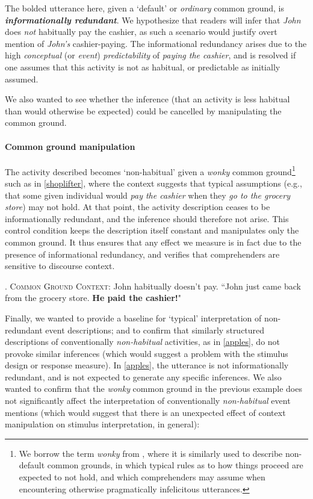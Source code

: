 \documentclass{sp}\usepackage[]{graphicx}\usepackage[]{color}
\begin{document}
The bolded utterance here, given a `default' or \textit{ordinary} common ground, is \textbf{\textit{informationally redundant}}.  We hypothesize that readers will infer that \textit{John} does \textit{not} habitually pay the cashier, as such a scenario would justify overt mention of \textit{John's} cashier-paying. The informational redundancy arises due to the high \textit{conceptual} (or \textit{event}) \textit{predictability} of \textit{paying the cashier}, and is resolved if one assumes that this activity is not as habitual, or predictable as initially assumed. 

We also wanted to see whether the inference (that an activity is less habitual than would otherwise be expected) could be cancelled by manipulating the common ground.

\paragraph{Common ground manipulation}

The activity described becomes `non-habitual' given a \textit{wonky} common ground\footnote{We borrow the term \textit{wonky} from \citet{Degen2015a}, where it is similarly used to describe non-default common grounds, in which typical rules as to how things proceed are expected to not hold, and which comprehenders may assume when encountering otherwise pragmatically infelicitous utterances.} such as in \ref{shoplifter}, where the context suggests that typical assumptions (e.g., that some given individual would \textit{pay the cashier} when they \textit{go to the grocery store}) may not hold.  At that point, the activity description ceases to be informationally redundant, and the inference should therefore not arise. This control condition keeps the description itself constant and manipulates only the common ground. It thus ensures that any effect we measure is in fact due to the presence of informational redundancy, and verifies that comprehenders are sensitive to discourse context.

\ex.\label{shoplifter} \textsc{Common Ground Context}: John habitually doesn't pay.  
``John just came back from the grocery store.  \textbf{He paid the cashier!}"

Finally, we wanted to provide a baseline for `typical' interpretation of non-redundant event descriptions; and to confirm that similarly structured descriptions of conventionally \textit{non-habitual} activities, as in \ref{apples}, do not provoke similar inferences (which would suggest a problem with the stimulus design or response measure). In \ref{apples}, the utterance is not informationally redundant, and is not expected to generate any specific inferences. We also wanted to confirm that the \textit{wonky} common ground in the previous example does not significantly affect the interpretation of conventionally \textit{non-habitual} event mentions (which would suggest that there is an unexpected effect of context manipulation on stimulus interpretation, in general): 
\end{document}
